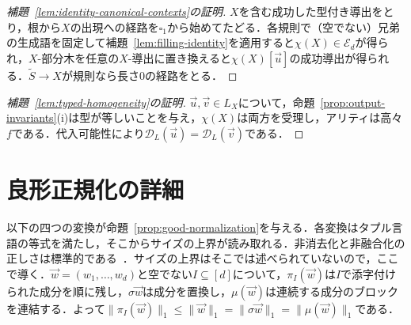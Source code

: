 \documentclass[11pt,a4paper]{ltjsarticle}
\numberwithin{equation}{section}
\theoremstyle{plain}
\theoremstyle{definition}
\theoremstyle{remark}
\newcommand{\D}{\mathcal{D}}
\newcommand{\tuple}[1]{\vec{#1}}
\newcommand{\blank}{\square}
\begin{document}
\begin{proof}[補題~\ref{lem:identity-canonical-contexts}の証明]
$X$を含む成功した型付き導出をとり，根から$X$の出現への経路を$\blank_1$から始めてたどる．各規則で（空でない）兄弟の生成語を固定して補題~\ref{lem:filling-identity}を適用すると$\chi(X)\in\mathcal E_d$が得られ，$X$-部分木を任意の$X$-導出に置き換えると$\chi(X)[\tuple u]$の成功導出が得られる．$\widetilde S\to X$が規則なら長さ0の経路をとる．
\end{proof}

\begin{proof}[補題~\ref{lem:typed-homogeneity}の証明]
$\tuple u,\tuple v\in L_X$について，命題~\ref{prop:output-invariants}(i)は型が等しいことを与え，$\chi(X)$は両方を受理し，アリティは高々$f$である．代入可能性により$\D_L(\tuple u)=\D_L(\tuple v)$である．
\end{proof}

\section{良形正規化の詳細}
\label{app:normalization-details}

以下の四つの変換が命題~\ref{prop:good-normalization}を与える．各変換はタプル言語の等式を満たし，そこからサイズの上界が読み取れる．非消去化と非融合化の正しさは標準的である~\cite{SekiEtAl1991,Kanazawa2019Ogden,Yoshinaka2011}．サイズの上界はそこでは述べられていないので，ここで導く．$\tuple w=(w_1,\ldots,w_d)$と空でない$I\subseteq[d]$について，$\pi_I(\tuple w)$は$I$で添字付けられた成分を順に残し，$\sigma\tuple w$は成分を置換し，$\mu(\tuple w)$は連続する成分のブロックを連結する．よって$\|\pi_I(\tuple w)\|_1\le\|\tuple w\|_1=\|\sigma\tuple w\|_1=\|\mu(\tuple w)\|_1$である．
\end{document}
